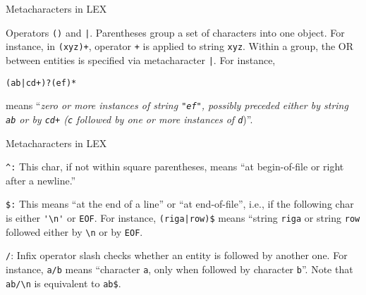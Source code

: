 \begin{frame}[fragile]{Metacharacters in LEX}

\begin{description}
\item{Operators {\tt ()} and {\tt \verb"|"}}. Parentheses group
a set of characters into one object. For instance,
in {\tt (xyz)+}, operator {\tt +} is applied to
string {\tt xyz}. Within a group, the OR between entities
is specified via metacharacter {\tt \verb"|"}.
For instance, 


\vspace{20pt}

\begin{center}{\tt (ab\verb"|"cd+)?(ef)*}
\end{center}


\vspace{20pt}

\noindent
means ``{\em zero or more instances of string {\tt "ef"}, possibly
preceded either by string {\tt ab} or by {\tt cd+} ({\tt c} followed
by one or more instances of {\tt d}})''.
\end{description}



\end{frame}
\begin{frame}[fragile]{Metacharacters in LEX}

\begin{description}
\item{\tt \verb"^":} This char, if not within square parentheses, means
``at begin-of-file or right after a newline.''

\item{\tt \verb"$":} This means ``at the end of a line''
or ``at end-of-file'', i.e., if the following char is either
\verb"'\n'" or {\tt EOF}.
For instance, \verb"(riga|row)$" means ``string {\tt riga}
or string {\tt row} followed either by \verb"\n" or by {\tt EOF}.

\item{\tt /}: Infix operator slash checks whether an entity is
followed by another one. For instance,
{\tt a/b} means
``character {\tt a}, only when followed by character {\tt b}''.
Note that {\tt ab/\verb"\n"} is equivalent to {\tt ab\verb"$"}.
\end{description}



\end{frame}
